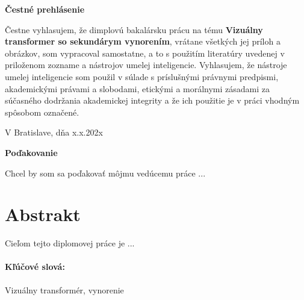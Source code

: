 \documentclass[12pt, twoside]{book}
\def\mfnazov{Vizuálny transformer so sekundárym vynorením}
\begin{document}
\setcounter{page}{3}



\vspace*{\fill}

\begin{flushleft}
    \textbf{\large Čestné prehlásenie}
\end{flushleft}

\noindent
Čestne vyhlasujem, že dimplovú bakalársku prácu na tému \textbf{\mfnazov}, vrátane všetkých jej príloh a obrázkov, som vypracoval samostatne, a to s použitím literatúry uvedenej v priloženom zozname a nástrojov umelej inteligencie. Vyhlasujem, že nástroje umelej inteligencie som použil v súlade s príslušnými právnymi predpismi, akademickými právami a slobodami, etickými a morálnymi zásadami za súčasného dodržania akademickej integrity a že ich použitie je v práci vhodným spôsobom označené.

\vspace{1cm}

\noindent
V Bratislave, dňa x.x.202x

\vspace{2cm}

\hfill \makebox[6cm]{\dotfill}

\vspace{-0.2cm}

\hfill {}
\newpage

\cleardoublepage
\vspace*{\fill}
\begin{flushleft}
    \textbf{\large Poďakovanie}
\end{flushleft}

Chcel by som sa poďakovať môjmu vedúcemu práce ...
\vspace{2cm}
\newpage



\newpage 
\section*{Abstrakt}
Cieľom tejto diplomovej práce je ...

\paragraph*{Kľúčové slová:} Vizuálny transformér, vynorenie
\end{document}
